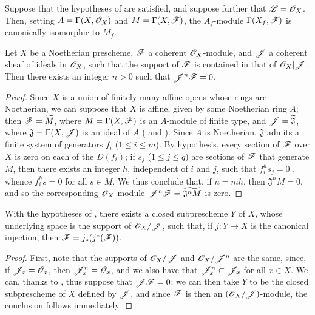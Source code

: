 \begin{corollary}[9.3.3]
\label{I.9.3.3}
Suppose that the hypotheses of  are satisfied, and suppose further that
$\mathscr{L}=\mathscr{O}_X$. Then, setting $A=\Gamma(X,\mathscr{O}_X)$ and $M=\Gamma(X,\mathscr{F})$, the $A_f$-module
$\Gamma(X_f,\mathscr{F})$ is canonically isomorphic to $M_f$.
\end{corollary}

\begin{proposition}[9.3.4]
\label{I.9.3.4}
Let $X$ be a Noetherian prescheme, $\mathscr{F}$ a coherent $\mathscr{O}_X$-module, and $\mathscr{J}$ a
coherent sheaf of ideals in $\mathscr{O}_X$, such that the support of $\mathscr{F}$ is contained in that
of $\mathscr{O}_X|\mathscr{J}$. Then there exists an integer $n>0$ such that $\mathscr{J}^n\mathscr{F}=0$.
\end{proposition}

\begin{proof}
Since $X$ is a union of finitely-many affine opens whose rings are Noetherian, we can suppose
that $X$ is affine, given by some Noetherian ring $A$; then $\mathscr{F}=\widetilde{M}$, where
$M=\Gamma(X,\mathscr{F})$ is an $A$-module of finite type, and $\mathscr{J}=\widetilde{\mathfrak{J}}$,
where $\mathfrak{J}=\Gamma(X,\mathscr{J})$ is an ideal of $A$ ( and
). Since $A$ is Noetherian, $\mathfrak{J}$ admits a finite system of
generators $f_i$ ($1\leq i\leq m$). By hypothesis, every section of $\mathscr{F}$ over
$X$ is zero on each of the $D(f_i)$; if $s_j$ ($1\leq j\leq q$) are sections of
$\mathscr{F}$ that generate $M$, then there exists an integer $h$, independent of $i$ and $j$,
such that $f_i^h s_j=0$ , whence $f_i^h s=0$ for all $s\in M$. We thus
conclude that, if $n=mh$, then $\mathfrak{J}^n M=0$, and so the corresponding $\mathscr{O}_X$-module
$\mathscr{J}^n\mathscr{F}=\widetilde{\mathfrak{J}^n M}$  is zero.
\end{proof}

\begin{corollary}[9.3.5]
\label{I.9.3.5}
With the hypotheses of , there exists a closed subprescheme $Y$ of $X$,
whose underlying space is the support of $\mathscr{O}_X/\mathscr{J}$, such that, if $j:Y\to X$ is the
canonical injection, then $\mathscr{F}=j_*(j^*(\mathscr{F}))$.
\end{corollary}

\begin{proof}
First, note that the supports of $\mathscr{O}_X/\mathscr{J}$ and $\mathscr{O}_X/\mathscr{J}^n$ are the same,
since, if $\mathscr{J}_x=\mathscr{O}_x$, then $\mathscr{J}_x^n=\mathscr{O}_x$, and we also have that
$\mathscr{J}_x^n\subset\mathscr{J}_x$ for all $x\in X$. We can, thanks to , thus
suppose that $\mathscr{J}\mathscr{F}=0$; we can then take $Y$ to be the closed subprescheme of $X$
defined by $\mathscr{J}$, and since $\mathscr{F}$ is then an $(\mathscr{O}_X/\mathscr{J})$-module, the conclusion
follows immediately.
\end{proof}

